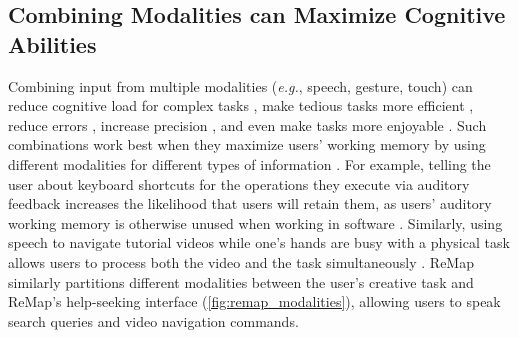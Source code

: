 \subsection{Combining Modalities can Maximize Cognitive Abilities}
Combining input from multiple modalities (\textit{e.g.}, speech, gesture, touch) can reduce cognitive load for complex tasks \cite{Oviatt2015, Reeves2004}, make tedious tasks more efficient \cite{Oviatt1999, Salisbury1990, Karl1993, Hugunin1997}, reduce errors \cite{Oviatt1999}, increase precision \cite{Cohen1989}, and even make tasks more enjoyable \cite{Oviatt1999, Laput2013}. Such combinations work best when they maximize users' working memory by using different modalities for different types of information \cite{Oviatt2015, Kalyuga1999, Reeves2004, Stanney2004}. 
For example, telling the user about keyboard shortcuts for the operations they execute via auditory feedback increases the likelihood that users will retain them, as users' auditory working memory is otherwise unused when working in software \cite{Grossman2007}. Similarly, using speech to navigate tutorial videos while one's hands are busy with a physical task allows users to process both the video and the task simultaneously \cite{Chang2019}. ReMap similarly partitions different modalities between the user's creative task and ReMap's help-seeking interface (\autoref{fig:remap_modalities}), allowing users to speak search queries and video navigation commands.

